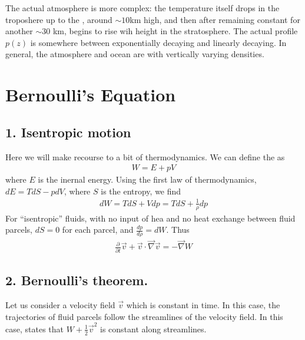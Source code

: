 \documentclass[letterpaper,10pt,english]{jupyterBook}
\begin{document}
\sphinxAtStartPar
The actual atmosphere is more complex: the temperature itself drops in the
troposhere up to the , around \(\sim 10\)km
high, and then after remaining constant for another \(\sim 30\) km,
begins to rise wih height in the stratosphere. The actual profile
\(p(z)\) is somewhere between exponentially decaying and linearly decaying.
In general, the atmosphere and ocean are  with
vertically varying densities.


\section{Bernoulli’s Equation}
\label{\detokenize{chapter1/Bernoulli:bernoulli-s-equation}}\label{\detokenize{chapter1/Bernoulli::doc}}

\subsection{1. Isentropic motion}
\label{\detokenize{chapter1/Bernoulli:isentropic-motion}}
\sphinxAtStartPar
Here we will make recourse to a bit of thermodynamics. We can define
the  as
\begin{equation}\label{equation:chapter1/Bernoulli:enthalpy}
\begin{split}W = E + p V\end{split}
\end{equation}
\sphinxAtStartPar
where \(E\) is the inernal energy. Using the first law of thermodynamics,
\(dE = T dS - p d V\), where \(S\) is the entropy, we find
\begin{equation}\label{equation:chapter1/Bernoulli:denth}
\begin{split}dW = T dS + V dp = T dS + \frac{1}{\rho} dp\end{split}
\end{equation}
\sphinxAtStartPar
For “isentropic” fluids, with no input of hea and no heat exchange between
fluid parcels, \(dS = 0\) for each parcel, and \(\frac{dp}{d\rho} = dW\). Thus
\begin{equation*}
\begin{split}\frac{\partial}{\partial t} {\vec v} + {\vec v} \cdot {\vec \nabla}
{\vec v} = - {\vec \nabla} W\end{split}
\end{equation*}

\subsection{2. Bernoulli’s theorem.}
\label{\detokenize{chapter1/Bernoulli:bernoulli-s-theorem}}
\sphinxAtStartPar
Let us consider a velocity field \({\vec v}\) which is constant in time.
In this case, the trajectories of fluid parcels follow the streamlines
of the velocity field. In this case,  states that
\(W + \frac{1}{2} {\vec v}^2\) is constant along streamlines.
\end{document}
